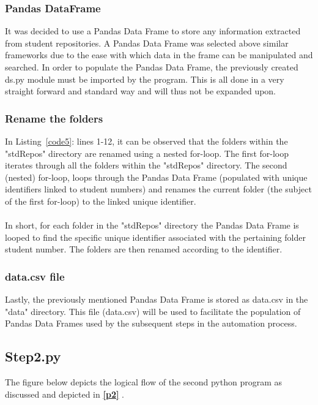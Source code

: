 \subsubsection{Pandas DataFrame}
\label{datFra}
It was decided to use a Pandas Data Frame to store any information extracted from student repositories. A Pandas Data Frame was selected above similar frameworks due to the ease with which data in the frame can be manipulated and searched. In order to populate the Pandas Data Frame, the previously created ds.py module must be imported by the program. This is all done in a very straight forward and standard way and will thus not be expanded upon.  


\subsubsection{Rename the folders}
\label{renFol}


In Listing~\ref{code5}: lines 1-12, it can be observed that the folders within the "stdRepos" directory are renamed using a nested for-loop. The first for-loop iterates through all the folders within the "stdRepos" directory. The second (nested) for-loop, loops through the Pandas Data Frame (populated with unique identifiers linked to student numbers) and renames the current folder (the subject of the first for-loop) to the linked unique identifier.
\\\\
In short, for each folder in the "stdRepos" directory the Pandas Data Frame is looped to find the specific unique identifier associated with the pertaining folder student number. The folders are then renamed according to the identifier. 


\subsubsection{data.csv file}
\label{data.csv}
Lastly, the previously mentioned Pandas Data Frame is stored as data.csv in the "data" directory. This file (data.csv) will be used to facilitate the population of Pandas Data Frames used by the subsequent steps in the automation process. 


\subsection{Step2.py}
\label{step2}

The figure below depicts the logical flow of the second python program as discussed and depicted in \textbf{\ref{p2} }. 

